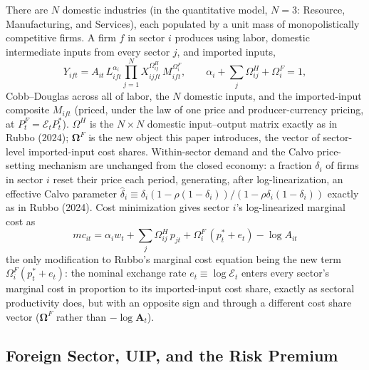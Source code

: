 \documentclass[12pt]{article}
\begin{document}
There are $N$ domestic industries (in the quantitative model, $N=3$: Resource, Manufacturing, and
Services), each populated by a unit mass of monopolistically competitive firms. A firm $f$ in sector
$i$ produces using labor, domestic intermediate inputs from every sector $j$, and imported inputs,
\begin{equation}
    Y_{ift} = A_{it}\,L_{ift}^{\alpha_i}\prod_{j=1}^N X_{ijft}^{\Omega^H_{ij}}\,M_{ift}^{\Omega^F_i},
    \qquad \alpha_i + \sum_j\Omega^H_{ij} + \Omega^F_i = 1,
\end{equation}
Cobb--Douglas across all of labor, the $N$ domestic inputs, and the imported-input composite $M_{ift}$
(priced, under the law of one price and producer-currency pricing, at $P_t^F = \mathcal E_t P_t^*$).
$\Omega^H$ is the $N\times N$ domestic input--output matrix exactly as in Rubbo (2024); $\bm\Omega^F$
is the new object this paper introduces, the vector of sector-level imported-input cost shares.
Within-sector demand and the Calvo price-setting mechanism are unchanged from the closed economy: a
fraction $\delta_i$ of firms in sector $i$ reset their price each period, generating, after
log-linearization, an effective Calvo parameter $\hat\delta_i \equiv
\delta_i(1-\rho(1-\delta_i))/(1-\rho\delta_i(1-\delta_i))$ exactly as in Rubbo (2024). Cost
minimization gives sector $i$'s log-linearized marginal cost as
\begin{equation}
    mc_{it} = \alpha_i w_t + \sum_j\Omega^H_{ij}\,p_{jt} + \Omega^F_i\,(p_t^* + e_t) - \log A_{it}
    \label{eq:mc_main}
\end{equation}
the only modification to Rubbo's marginal cost equation being the new term $\Omega^F_i(p_t^*+e_t)$:
the nominal exchange rate $e_t\equiv\log\mathcal E_t$ enters every sector's marginal cost in
proportion to its imported-input cost share, exactly as sectoral productivity does, but with an
opposite sign and through a different cost share vector ($\bm\Omega^F$ rather than $-\log\mathbf A_t$).

\subsection{Foreign Sector, UIP, and the Risk Premium}
\end{document}
